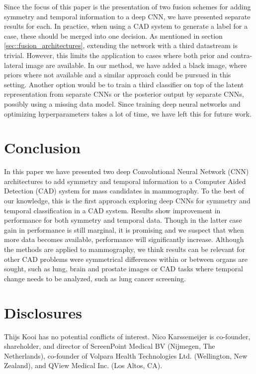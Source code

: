 \documentclass[12pt]{spieman}  %
\begin{document}
Since the focus of this paper is the presentation of two fusion schemes for adding symmetry and temporal information to a deep CNN, we have presented separate results for each. In practice, when using a CAD system to generate a label for a case, these should be merged into one decision. As mentioned in section \ref{sec::fusion_architectures}, extending the network with a third datastream is trivial. However, this limits the application to cases where both prior and contra-lateral image are available. In our method, we have added a black image, where priors where not available and a similar approach could be pursued in this setting. Another option would be to train a third classifier on top of the latent representation from separate CNNs or the posterior output by separate CNNs, possibly using a missing data model. Since training deep neural networks and optimizing hyperparameters takes a lot of time, we have left this for future work. 
\section{Conclusion}
\label{sec::conclusion}
In this paper we have presented two deep Convolutional Neural Network (CNN) architectures to add symmetry and temporal information to a Computer Aided Detection (CAD) system for mass candidates in mammography. To the best of our knowledge, this is the first approach exploring deep CNNs for symmetry and temporal classification in a CAD system. Results show improvement in performance for both symmetry and temporal data. Though in the latter case gain in performance is still marginal, it is promising and we suspect that when more data becomes available, performance will significantly increase. Although the methods are applied to mammography, we think results can be relevant for other CAD problems were symmetrical differences within or between organs are sought, such as lung, brain and prostate images or CAD tasks where temporal change needs to be analyzed, such as lung cancer screening. \\

\section*{Disclosures}
Thijs Kooi has no potential conflicts of interest. Nico Karssemeijer is co-founder, shareholder, and director of ScreenPoint Medical BV (Nijmegen, The Netherlands), co-founder of Volpara Health Technologies Ltd. (Wellington, New Zealand), and QView Medical Inc. (Los Altos, CA).
\end{document}
